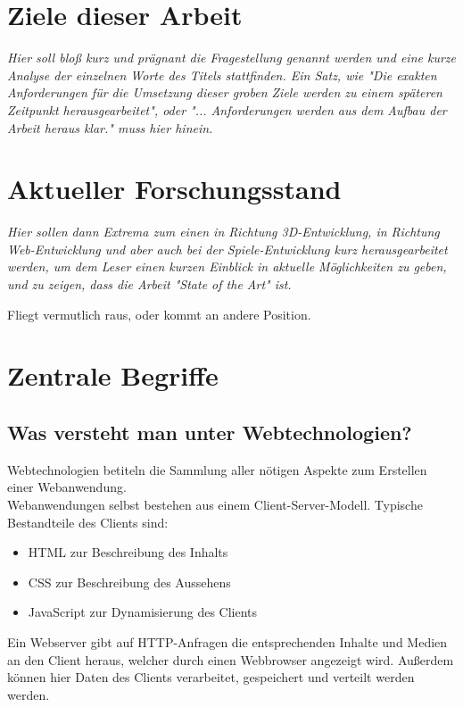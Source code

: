 \section{Ziele dieser Arbeit}
\label{sec:ziele_dieser_arbeit}

\emph{Hier soll bloß kurz und prägnant die Fragestellung genannt werden und eine kurze Analyse der einzelnen Worte des Titels stattfinden. Ein Satz, wie "Die exakten Anforderungen für die Umsetzung dieser groben Ziele werden zu einem späteren Zeitpunkt herausgearbeitet", oder "... Anforderungen werden aus dem Aufbau der Arbeit heraus klar." muss hier hinein.}

\section{Aktueller Forschungsstand}
\label{sec:aktueller_forschungsstand}

\emph{Hier sollen dann Extrema zum einen in Richtung 3D-Entwicklung, in Richtung Web-Entwicklung und aber auch bei der Spiele-Entwicklung kurz herausgearbeitet werden, um dem Leser einen kurzen Einblick in aktuelle Möglichkeiten zu geben, und zu zeigen, dass die Arbeit "State of the Art" ist.}

Fliegt vermutlich raus, oder kommt an andere Position.

\section{Zentrale Begriffe}
\label{sec:zentrale_begriffe}

\subsection{Was versteht man unter Webtechnologien?}
Webtechnologien betiteln die Sammlung aller nötigen Aspekte zum Erstellen einer Webanwendung.\\
Webanwendungen selbst bestehen aus einem Client-Server-Modell.
Typische Bestandteile des Clients sind: 
\begin{itemize}
	\item HTML zur Beschreibung des Inhalts
	\item CSS zur Beschreibung des Aussehens
	\item JavaScript zur Dynamisierung des Clients
\end{itemize}
Ein Webserver gibt auf HTTP-Anfragen die entsprechenden Inhalte und Medien an den Client heraus, welcher durch einen Webbrowser angezeigt wird. Außerdem können hier Daten des Clients verarbeitet, gespeichert und verteilt werden werden.
